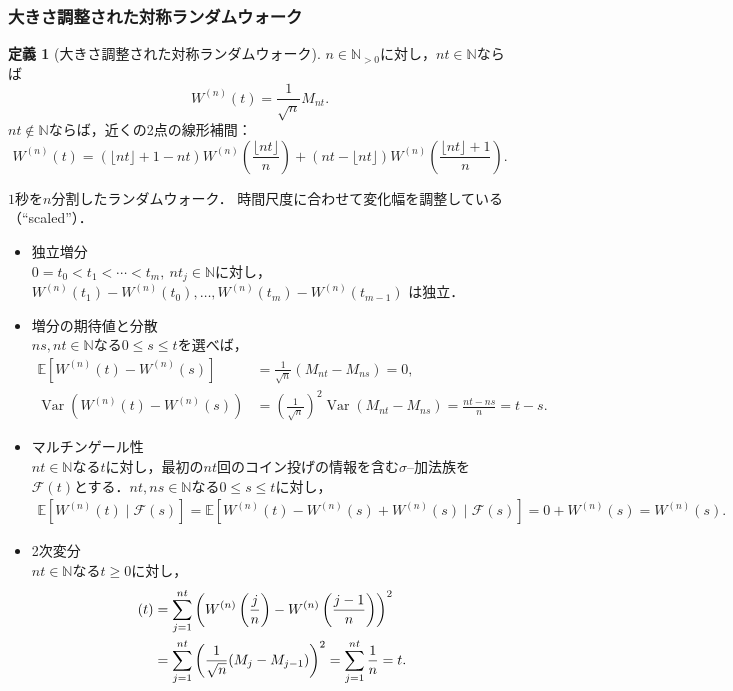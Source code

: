 \documentclass[a4paper, lualatex, ja=standard]{bxjsarticle}
\theoremstyle{definition}
\newtheorem*{dfn*}{定義}
\begin{document}
\subsubsection{大きさ調整された対称ランダムウォーク}
\begin{dfn*}[大きさ調整された対称ランダムウォーク]
  $n\in\mathbb{N}_{>0}$に対し，$nt\in\mathbb{N}$ならば
  \begin{equation}
    W^{(n)}(t)=\frac{1}{\sqrt{n}}M_{nt}.
  \end{equation}
  $nt\not\in\mathbb{N}$ならば，近くの2点の線形補間：
  \begin{equation*}
    W^{(n)}(t)
    = \left(\lfloor nt\rfloor+1-nt\right)W^{(n)}\left(\frac{\lfloor nt\rfloor}{n}\right)
    + \left(nt-\lfloor nt\rfloor\right)  W^{(n)}\left(\frac{\lfloor nt\rfloor+1}{n}\right).
  \end{equation*}
\end{dfn*}
$1$秒を$n$分割したランダムウォーク．
時間尺度に合わせて変化幅を調整している（``scaled''）．

\begin{itemize}
  \item 独立増分\\
  $0=t_0<t_1<\cdots<t_m,\ nt_j\in\mathbb{N}$に対し，$W^{(n)}(t_1)-W^{(n)}(t_0), \ldots, W^{(n)}(t_m)-W^{(n)}(t_{m-1})$ は独立．
  \item 増分の期待値と分散\\
  $ns,nt\in\mathbb{N}$なる$0\leq s\leq t$を選べば，
  \begin{equation}
    \begin{aligned}
      \mathbb{E}[W^{(n)}(t)-W^{(n)}(s)] &= \frac{1}{\sqrt{n}}(M_{nt}-M_{ns})=0,\\
      \operatorname{Var}(W^{(n)}(t)-W^{(n)}(s)) &= \left(\frac{1}{\sqrt{n}}\right)^2\operatorname{Var}(M_{nt}-M_{ns})=\frac{nt-ns}{n}=t-s.
    \end{aligned}
  \end{equation}
  \item マルチンゲール性\\
  $nt\in\mathbb{N}$なる$t$に対し，最初の$nt$回のコイン投げの情報を含む$\sigma$--加法族を$\mathcal{F}(t)$とする．$nt, ns\in\mathbb{N}$なる$0\leq s\leq t$に対し，
  \begin{align}
    \mathbb{E}[W^{(n)}(t)\mid \mathcal{F}(s)] = \mathbb{E}[W^{(n)}(t)-W^{(n)}(s)+W^{(n)}(s)\mid\mathcal{F}(s)]=0+W^{(n)}(s) = W^{(n)}(s).
  \end{align}
  \item 2次変分\\
  $nt\in\mathbb{N}$なる$t\geq0$に対し，
  \begin{align}
    [W^{(n)},W^{(n)}](t) &= \sum_{j=1}^{nt} \left(W^{(n)}\left(\frac{j}{n}\right)-W^{(n)}\left(\frac{j-1}{n}\right)\right)^2 \notag\\
    &= \sum_{j=1}^{nt} \left(\frac{1}{\sqrt{n}}(M_j-M_{j-1})\right)^2 = \sum_{j=1}^{nt} \frac{1}{n} = t.
  \end{align}
\end{itemize}
\end{document}

